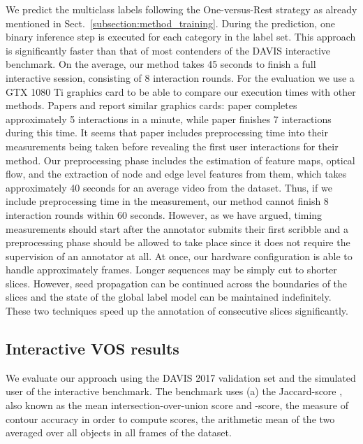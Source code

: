 \documentclass[conference]{IEEEtran}
\begin{document}
We predict the multiclass labels following the One-versus-Rest strategy as already mentioned in Sect.~\ref{subsection:method_training}. During the prediction, one binary inference step is executed for each category in the label set. This approach is significantly faster than that of most contenders of the DAVIS interactive benchmark. On the average, our method takes 45 seconds to finish a full interactive session, consisting of 8 interaction rounds. For the evaluation we use a GTX 1080 Ti graphics card to be able to compare our execution times with other methods. Papers \cite{interactive_oh_cvpr19} and \cite{interactive_ma_net} report similar graphics cards: paper \cite{interactive_oh_cvpr19} completes approximately 5 interactions in a minute, while paper \cite{interactive_ma_net} finishes 7 interactions during this time. It seems that paper \cite{interactive_ma_net} includes preprocessing time into their measurements being taken before revealing the first user interactions for their method. Our preprocessing phase includes the estimation of feature maps, optical flow, and the extraction of node and edge level features from them, which takes approximately 40 seconds for an average video from the dataset. Thus, if we include preprocessing time in the measurement, our method cannot finish 8 interaction rounds within 60 seconds. However, as we have argued, timing measurements should start after the annotator submits their first scribble and a preprocessing phase should be allowed to take place since it does not require the supervision of an annotator at all. At once, our hardware configuration is able to handle approximately  frames. Longer sequences may be simply cut to shorter slices. However, seed propagation can be continued across the boundaries of the slices and the state of the global label model can be maintained indefinitely. These two techniques speed up the annotation of consecutive slices significantly.

\subsection{Interactive VOS results}

We evaluate our approach using the DAVIS 2017 validation set and the simulated user of the interactive benchmark. The benchmark uses (a) the Jaccard-score , also known as the mean intersection-over-union score and -score, the measure of contour accuracy \cite{davis_challenge17} in order to compute  scores, the arithmetic mean of the two averaged over all objects in all frames of the dataset.
\end{document}
